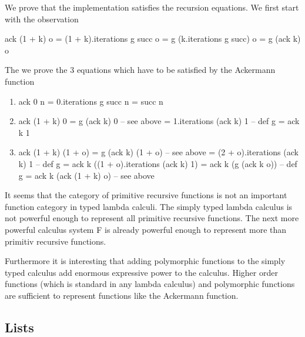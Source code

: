 We prove that the implementation satisfies the recursion equations. We first
start with the observation

\begin{alba}
  ack (1 + k) o  = (1 + k).iterations g succ o
                 = g (k.iterations g succ) o
                 = g (ack k) o
\end{alba}

The we prove the 3 equations which have to be satisfied by the Ackermann
function
\begin{enumerate}
\item
  \begin{alba}
    ack 0 n  = 0.iterations g succ n
             = succ n
  \end{alba}


\item
  \begin{alba}
    ack (1 + k) 0  = g (ack k) 0               -- see above
                   = 1.iterations (ack k) 1    -- def g
                   = ack k 1
  \end{alba}


\item
  \begin{alba}
    ack (1 + k) (1 + o) = g (ack k) (1 + o)             -- see above
                        = (2 + o).iterations (ack k) 1  -- def g
                        = ack k ((1 + o).iterations (ack k) 1)
                        = ack k (g (ack k o))           -- def g
                        = ack k (ack (1 + k) o)         -- see above
  \end{alba}

\end{enumerate}

It seems that the category of primitive recursive functions is not an
important function category in typed lambda calculi. The simply typed lambda
calculus is not powerful enough to represent all primitive recursive
functions. The next more powerful calculus system F is already powerful enough
to represent more than primitiv recursive functions.

Furthermore it is interesting that adding polymorphic functions to the simply
typed calculus add enormous expressive power to the calculus. Higher order
functions (which is standard in any lambda calculus) and polymorphic functions
are sufficient to represent functions like the Ackermann function.




\subsection{Lists}

